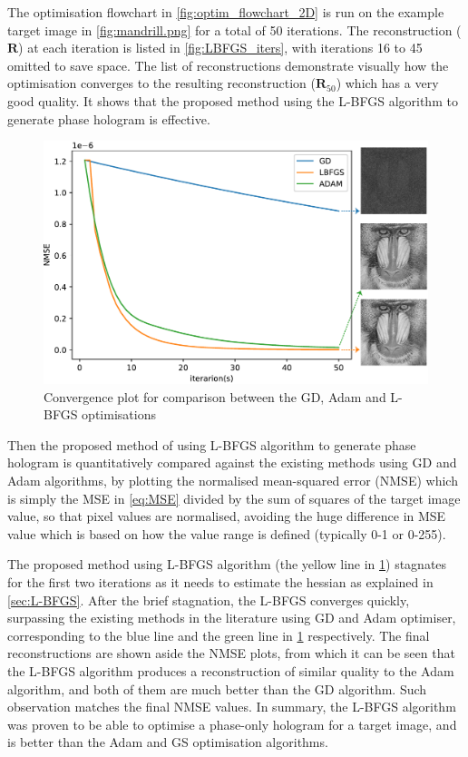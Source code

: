 The optimisation flowchart in \cref{fig:optim_flowchart_2D} is run on the example target image in \cref{fig:mandrill.png} for a total of 50 iterations. The reconstruction ($\textbf{R}$) at each iteration is listed in \cref{fig:LBFGS_iters}, with iterations 16 to 45 omitted to save space. The list of reconstructions demonstrate visually how the optimisation converges to the resulting reconstruction ($\textbf{R}_{50}$) which has a very good quality. It shows that the proposed method using the L-BFGS algorithm to generate phase hologram is effective.

\begin{figure}[H]
	\centering
	\includegraphics[width=\textwidth]{GD_ADAM_LBFGS.pdf}
	\caption{Convergence plot for comparison between the GD, Adam and L-BFGS optimisations}
	\label{fig:GD_ADAM_LBFGS}
\end{figure}

Then the proposed method of using L-BFGS algorithm to generate phase hologram is quantitatively compared against the existing methods using GD and Adam algorithms, by plotting the normalised mean-squared error (NMSE) which is simply the MSE in \cref{eq:MSE} divided by the sum of squares of the target image value, so that pixel values are normalised, avoiding the huge difference in MSE value which is based on how the value range is defined (typically 0-1 or 0-255).

The proposed method using L-BFGS algorithm (the yellow line in \cref{fig:GD_ADAM_LBFGS}) stagnates for the first two iterations as it needs to estimate the hessian as explained in \cref{sec:L-BFGS}. After the brief stagnation, the L-BFGS converges quickly, surpassing the existing methods in the literature using GD and Adam optimiser, corresponding to the blue line and the green line in \cref{fig:GD_ADAM_LBFGS} respectively. The final reconstructions are shown aside the NMSE plots, from which it can be seen that the L-BFGS algorithm produces a reconstruction of similar quality to the Adam algorithm, and both of them are much better than the GD algorithm. Such observation matches the final NMSE values. In summary, the L-BFGS algorithm was proven to be able to optimise a phase-only hologram for a target image, and is better than the Adam and GS optimisation algorithms.



